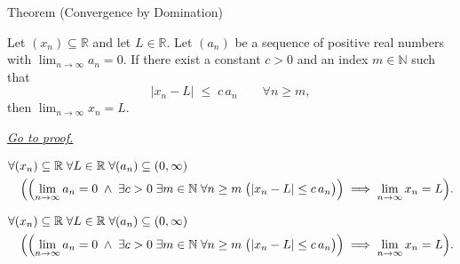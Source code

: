 \begin{theorembox}{Theorem (Convergence by Domination)}
\begin{theorem}
\label{thm:convergence-by-domination}

Let $(x_n) \subseteq \mathbb{R}$ and let $L \in \mathbb{R}$. Let
$(a_n)$ be a sequence of positive real numbers with
$\displaystyle\lim_{n \to \infty} a_n = 0$. If there exist a constant
$c > 0$ and an index $m \in \mathbb{N}$ such that
\[
    |x_n - L| \;\le\; c\, a_n \qquad \forall n \ge m,
\]
then $\displaystyle\lim_{n \to \infty} x_n = L$.

\smallskip
\noindent
\hyperref[prf:convergence-by-domination]{\textit{Go to proof.}}
\end{theorem}
\end{theorembox}

\begin{remark*}
\[
\begin{aligned}
&\forall (x_n) \subseteq \mathbb{R} \;\forall L \in \mathbb{R}
 \;\forall (a_n) \subseteq (0, \infty)\\
&\quad\Bigl(
    \Bigl(
        \lim_{n \to \infty} a_n = 0
        \;\land\;
        \exists c > 0 \;\exists m \in \mathbb{N}
        \;\forall n \ge m \;\bigl(|x_n - L| \le c\, a_n\bigr)
    \Bigr)
    \;\Longrightarrow\;
    \lim_{n \to \infty} x_n = L
\Bigr).
\end{aligned}
\]
\end{remark*}

\begin{remark*}
\[
\begin{aligned}
&\forall (x_n) \subseteq \mathbb{R} \;\forall L \in \mathbb{R}
 \;\forall (a_n) \subseteq (0, \infty)\\
&\quad\Bigl(
    \Bigl(
        \lim_{n \to \infty} a_n = 0
        \;\land\;
        \exists c > 0 \;\exists m \in \mathbb{N}
        \;\forall n \ge m \;\bigl(|x_n - L| \le c\, a_n\bigr)
    \Bigr)
    \;\Longrightarrow\;
    \lim_{n \to \infty} x_n = L
\Bigr).
\end{aligned}
\]
\end{remark*}

